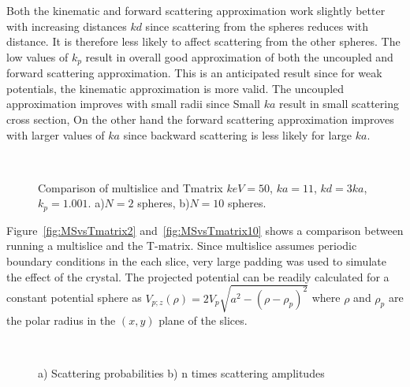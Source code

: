 Both the kinematic and forward scattering approximation work slightly better with
increasing distances $kd$ since scattering from the spheres reduces with distance. It is therefore less likely to affect scattering from the other spheres.
The low values of $k_p$ result in overall good approximation of both the uncoupled and forward scattering approximation. This is an anticipated result since for weak potentials, the kinematic approximation is more valid.
The uncoupled approximation improves with small radii since Small $ka$ result in small scattering cross section,
On the other hand the forward scattering approximation improves with larger values of $ka$ since backward scattering is less likely for large $ka$.

\begin{figure}[h!]
  \centering
  \\
  \vspace{-2em}
\caption{Comparison of multislice and Tmatrix
$keV=50$, $ka=11$, $kd=3ka$, $k_p=1.001$.
a)$N=2$ spheres,
b)$N=10$ spheres.
}%
\end{figure}

Figure~\ref{fig:MSvsTmatrix2} and~\ref{fig:MSvsTmatrix10} shows a comparison between running a multislice
and the T-matrix. Since multislice assumes periodic boundary conditions in the
each slice, very large padding was used to simulate the effect of the crystal.
The projected potential can be readily calculated for a constant potential sphere
as $V_{p;z}(\rho) = 2V_p\sqrt{a^2-\left(\rho-\rho_p\right)^2}$
where $\rho$ and $\rho_p$
are the polar radius in the $(x,y)$ plane of the slices.


\begin{figure}[h!]
  \centering
  \\
  \vspace{-2em}
  \caption{
a) Scattering probabilities
b) n times scattering amplitudes
}%
\end{figure}




